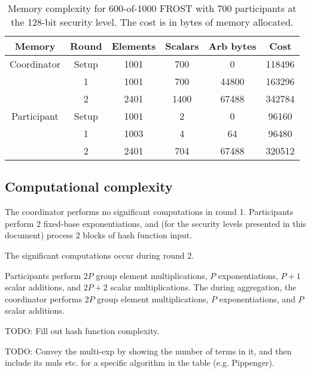 \begin{table}
	\centering
	\begin{tabular}{c c c c c c}
		\toprule
		Memory & Round & Elements & Scalars & Arb bytes & Cost \\ \midrule
		Coordinator & Setup & 1001 & 700 & 0 & 118496 \\
		            & 1 & 1001 & 700 & 44800 & 163296 \\
		            & 2 & 2401 & 1400 & 67488 & 342784 \\
		\midrule
		Participant & Setup & 1001 & 2 & 0 & 96160 \\
		            & 1 & 1003 & 4 & 64 & 96480 \\
		            & 2 & 2401 & 704 & 67488 & 320512 \\
		\bottomrule
	\end{tabular}
	\caption{Memory complexity for 600-of-1000 FROST with 700 participants at the 128-bit security level. The cost is in bytes of memory allocated.}
\end{table}

\subsection{Computational complexity}

The coordinator performs no significant computations in round 1. Participants
perform 2 fixed-base exponentiations, and (for the security levels presented in
this document) process 2 blocks of hash function input.

The significant computations occur during round 2.

Participants perform $2P$ group element multiplications, $P$ exponentiations,
$P + 1$ scalar additions, and $2P + 2$ scalar multiplications. The during
aggregation, the coordinator performs $2P$ group element multiplications, $P$
exponentiations, and $P$ scalar additions.

TODO: Fill out hash function complexity.

TODO: Convey the multi-exp by showing the number of terms in it, and then include
its muls etc. for a specific algorithm in the table (e.g. Pippenger).

